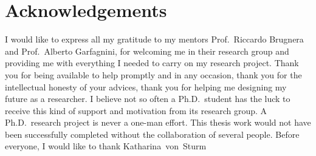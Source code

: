 
\chapter*{Acknowledgements}

I would like to express all my gratitude to my mentors Prof.~Riccardo Brugnera and
Prof.~Alberto Garfagnini, for welcoming me in their research group and providing me with
everything I needed to carry on my research project. Thank you for being available to help
promptly and in any occasion, thank you for the intellectual honesty of your advices,
thank you for helping me designing my future as a researcher. I believe not so often a
Ph.D.~student has the luck to receive this kind of support and motivation from its
research group.
\newpar
A Ph.D.~research project is never a one-man effort. This thesis work would not have been
successfully completed without the collaboration of several people. Before everyone, I
would like to thank Katharina~von~Sturm

